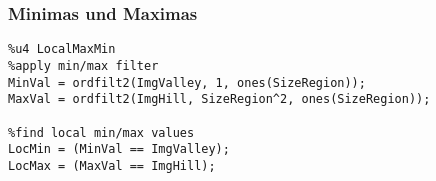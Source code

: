 \subsubsection{Minimas und Maximas}
\begin{lstlisting}
%u4 LocalMaxMin
%apply min/max filter
MinVal = ordfilt2(ImgValley, 1, ones(SizeRegion));
MaxVal = ordfilt2(ImgHill, SizeRegion^2, ones(SizeRegion));

%find local min/max values
LocMin = (MinVal == ImgValley);
LocMax = (MaxVal == ImgHill);
\end{lstlisting}
